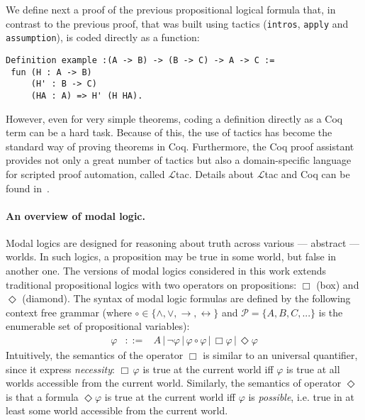 \documentclass[sigconf]{acmart}
\begin{document}
We define next a proof of the previous propositional logical formula
that, in contrast to the previous proof, that was built using tactics
(\texttt{intros}, \texttt{apply} and \texttt{assumption}), is coded
directly as a function:
\begin{verbatim}
Definition example :(A -> B) -> (B -> C) -> A -> C :=
 fun (H : A -> B)
     (H' : B -> C)
     (HA : A) => H' (H HA).
\end{verbatim}
However, even for very simple theorems, coding a definition directly
as a Coq term can be a hard task. Because of this, the use of tactics
has become the standard way of proving theorems in Coq. Furthermore,
the Coq proof assistant provides not only a great number of tactics
but also a domain-specific language for scripted proof automation,
called $\mathcal{L}$tac. Details about $\mathcal{L}$tac and Coq can be found
in~\cite{Chlipala13,Bertot10,manual_coq}.

\paragraph{An overview of modal logic.} Modal logics are designed for reasoning
about truth across various --- abstract --- worlds. In such logics, a
proposition may be true in some world, but false in another one. The versions of
modal logics considered in this work extends traditional propositional logics
with two operators on propositions: $\Box$ (box) and $\Diamond$ (diamond).
The syntax of modal logic formulas are defined by the following context free
grammar (where $\circ \in\{\land,\lor,\to,\leftrightarrow\}$ and
$\mathcal{P} = \{A,B,C,...\}$ is the enumerable set of propositional variables):
\[
  \begin{array}{lcl}
    \varphi & ::= & A\,|\,\neg\varphi\,|\,\varphi\circ\varphi\,|\,\Box\varphi\,|\,\Diamond\varphi
  \end{array}  
\]
Intuitively, the semantics of the operator $\Box$ is similar to an universal
quantifier, since it express \emph{necessity}: $\Box\,\varphi$ is true at the
current world iff $\varphi$ is true at all worlds accessible from the current
world. Similarly, the semantics of operator
$\Diamond$ is that a formula $\Diamond\varphi$ is true at the current
world iff $\varphi$ is \emph{possible}, i.e. true in at least some world
accessible from the current world.
\end{document}
